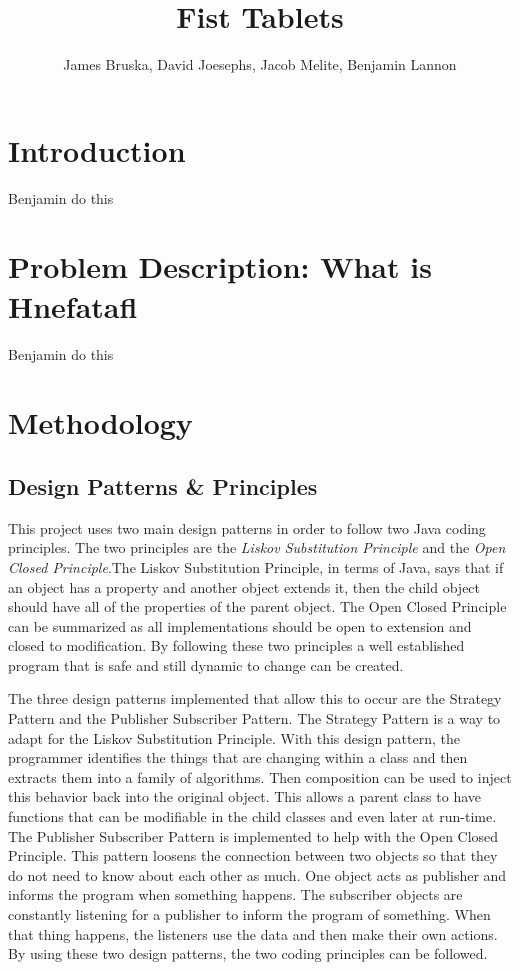 \documentclass{article}
\title{Fist Tablets}
\author{James Bruska, David Joesephs, Jacob Melite, Benjamin Lannon}
\begin{document}
\maketitle
\tableofcontents


\section{Introduction}
Benjamin do this

\section{Problem Description: What is Hnefatafl}
Benjamin do this

\section{Methodology}

\subsection{Design Patterns \& Principles}
	This project uses two main design patterns in order to follow two Java coding principles. The two principles are the \textit{Liskov Substitution Principle} and the \textit{Open Closed Principle}.The Liskov Substitution Principle, in terms of Java, says that if an object has a property and another object extends it, then the child object should have all of the properties of the parent object. The Open Closed Principle can be summarized as all implementations should be open to extension and closed to modification. By following these two principles a well established program that is safe and still dynamic to change can be created. \par
	The three design patterns implemented that allow this to occur are the Strategy Pattern and the Publisher Subscriber Pattern. The Strategy Pattern is a way to adapt for the Liskov Substitution Principle. With this design pattern, the programmer identifies the things that are changing within a class and then extracts them into a family of algorithms. Then composition can be used to inject this behavior back into the original object. This allows a parent class to have functions that can be modifiable in the child classes and even later at run-time. The Publisher Subscriber Pattern is implemented to help with the Open Closed Principle. This pattern loosens the connection between two objects so that they do not need to know about each other as much. One object acts as publisher and informs the program when something happens. The subscriber objects are constantly listening for a publisher to inform the program of something. When that thing happens, the listeners use the data and then make their own actions. By using these two design patterns, the two coding principles can be followed.  
\end{document}
